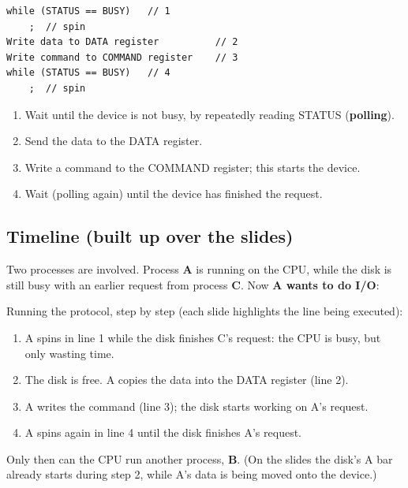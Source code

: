 \documentclass[11pt,a4paper]{article}
\newcommand{\seg}[6]{%
  \draw[fill=#5] (#2,#1) rectangle (#3,{#1+0.45});
  \node[font=\small\bfseries, text=#6] at ({(#2+#3)/2},{#1+0.225}) {#4};}
\newcommand{\rows}[1]{%
  \node[anchor=east, font=\small\bfseries] at (-0.15,0.975) {CPU:};
  \node[anchor=east, font=\small\bfseries] at (-0.15,0.225) {Disk:};
  \draw[-{Latex}, g3] (0,-0.35) -- (#1,-0.35) node[right, font=\scriptsize] {time};}
\newcommand{\A}{g3}\newcommand{\B}{g1}\newcommand{\C}{black!85}
\begin{document}
\begin{lstlisting}
while (STATUS == BUSY)   // 1
    ;  // spin
Write data to DATA register          // 2
Write command to COMMAND register    // 3
while (STATUS == BUSY)   // 4
    ;  // spin
\end{lstlisting}

\begin{enumerate}[label=\textbf{\arabic*.}]
  \item Wait until the device is not busy, by repeatedly reading STATUS
        (\textbf{polling}).
  \item Send the data to the DATA register.
  \item Write a command to the COMMAND register; this starts the device.
  \item Wait (polling again) until the device has finished the request.
\end{enumerate}

\subsection{Timeline (built up over the slides)}

Two processes are involved. Process \textbf{A} is running on the CPU, while
the disk is still busy with an earlier request from process \textbf{C}. Now
\textbf{A wants to do I/O}:

\begin{center}
\end{center}

Running the protocol, step by step (each slide highlights the line being
executed):
\begin{enumerate}[label=\textbf{\arabic*.}]
  \item A spins in line 1 while the disk finishes C's request: the CPU is
        busy, but only wasting time.
  \item The disk is free. A copies the data into the DATA register (line 2).
  \item A writes the command (line 3); the disk starts working on A's
        request.
  \item A spins again in line 4 until the disk finishes A's request.
\end{enumerate}
Only then can the CPU run another process, \textbf{B}. (On the slides the
disk's A bar already starts during step 2, while A's data is being moved
onto the device.)
\end{document}
